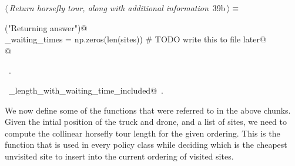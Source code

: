 \documentclass[11.5pt]{report}
\begin{document}
\begin{flushleft} \small\label{scrap42}\raggedright\small
{} $\langle\,${\itshape Return horsefly tour, along with additional information}\nobreak\ {\footnotesize {39b}}$\,\rangle\equiv$
\vspace{-1ex}
\begin{list}{}{} \item
\mbox{}\verb@debug("Returning answer")@\\
\mbox{}\verb@horse_waiting_times = np.zeros(len(sites)) # TODO write this to file later@\\
\mbox{}@\\
\mbox{}\verb@@{\NWsep}
\end{list}
\vspace{-1.5ex}
\footnotesize
\begin{list}{}{\setlength{\itemsep}{-\parsep}\setlength{\itemindent}{-\leftmargin}}
\item \NWtxtMacroRefIn\ .
\item \NWtxtIdentsUsed\nobreak\  \verb@tour_length_with_waiting_time_included@\nobreak\ .
\item{}
\end{list}
\vspace{4ex}
\end{flushleft}
\vspace{-0.8cm}\newchunk We now define some of the functions that were referred to in the above chunks. 
Given the intial position of the truck and drone, and a list of sites, we need to compute 
the collinear horsefly tour length for the given ordering. This is the function that is 
used in every policy class while deciding which is the cheapest unvisited site to insert 
into the current ordering of visited sites. 
\end{document}
